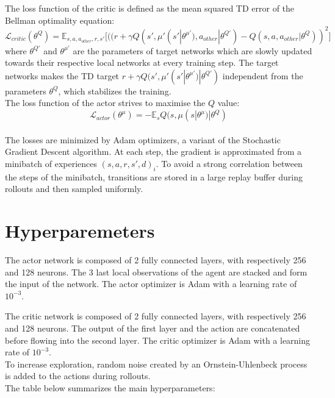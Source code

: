 \documentclass{article}
\begin{document}
    The loss function of the critic is defined as the mean squared TD error of the Bellman optimality equation:
    \[
        \mathcal{L}_{critic}(\theta^Q) = \mathbb{E}_{s, a, a_{other}, r, s'} \big[((r + \gamma Q(s', \mu'(s'| \theta^{\mu'}), a_{other}| \theta^{Q'}) - Q(s, a, a_{other}| \theta^Q))^2\big]
    \]
    where $\theta^{Q'}$ and $\theta^{\mu'}$ are the parameters of target networks which are slowly updated towards their respective local networks at every training step.
    The target networks makes the TD target $r + \gamma Q(s', \mu'(s'| \theta^{\mu'})| \theta^{Q'})$ independent from the parameters $\theta^Q$,
    which stabilizes the training.\\

    The loss function of the actor strives to maximise the $Q$ value:
    \[
        \mathcal{L}_{actor}(\theta^{\mu}) = - \mathbb{E}_{s} Q(s, \mu(s | \theta^\mu) | \theta^Q)
    \]\\

    The losses are minimized by Adam optimizers, a variant of the Stochastic Gradient Descent algorithm.
    At each step, the gradient is approximated from a minibatch of experiences ${(s, a, r, s', d)_i}$.
    To avoid a strong correlation between the steps of the minibatch, transitions are stored in a large replay buffer
    during rollouts and then sampled uniformly.


    \section{Hyperparemeters}\label{sec:hyperparemeters}

    The actor network is composed of 2 fully connected layers, with respectively 256 and 128 neurons.
    The 3 last local observations of the agent are stacked and form the input of the network.
    The actor optimizer is Adam with a learning rate of $10^{-3}$.

    The critic network is composed of 2 fully connected layers, with respectively 256 and 128 neurons.
    The output of the first layer and the action are concatenated before flowing into the second layer.
    The critic optimizer is Adam with a learning rate of $10^{-3}$.\\

    To increase exploration, random noise created by an Ornstein-Uhlenbeck process is added to the actions during rollouts.\\

    The table below summarizes the main hyperparameters:
\end{document}
